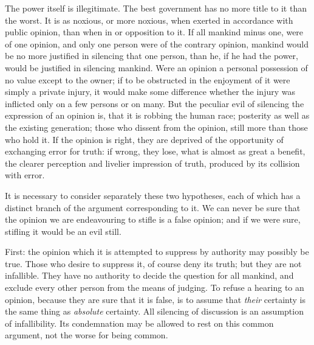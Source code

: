 The power itself is illegitimate. The best government has no more title to it than the worst. It is as noxious, or more noxious, when exerted in accordance with public opinion, than when in or opposition to it. If all mankind minus one, were of one opinion, and only one person were of the contrary opinion, mankind would be no more justified in silencing that one person, than he, if he had the power, would be justified in silencing mankind. Were an opinion a personal possession of no value except to the owner; if to be obstructed in the enjoyment of it were simply a private injury, it would make some difference whether the injury was inflicted only on a few persons or on many. But the peculiar evil of silencing the expression of an opinion is, that it is robbing the human race; posterity as well as the existing generation; those who dissent from the opinion, still more than those who hold it. If the opinion is right, they are deprived of the opportunity of exchanging error for truth: if wrong, they lose, what is almost as great a benefit, the clearer perception and livelier impression of truth, produced by its collision with error.\par

It is necessary to consider separately these two hypotheses, each of which has a distinct branch of the argument corresponding to it. We can never be sure that the opinion we are endeavouring to stifle is a false opinion; and if we were sure, stifling it would be an evil still.\par

First: the opinion which it is attempted to suppress by authority may possibly be true. Those who desire to suppress it, of course deny its truth; but they are not infallible. They have no authority to decide the question for all mankind, and exclude every other person from the means of judging. To refuse a hearing to an opinion, because they are sure that it is false, is to assume that \textit{their} certainty is the same thing as \textit{absolute} certainty. All silencing of discussion is an assumption of infallibility. Its condemnation may be allowed to rest on this common argument, not the worse for being common.\par

